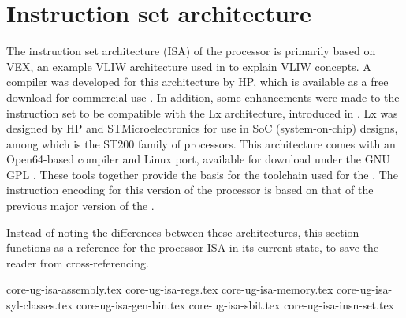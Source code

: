 
\clearpage
\section{Instruction set architecture}
\label{sec:core-ug-isa}

The instruction set architecture (ISA) of the \rvex{} processor is primarily 
based on VEX, an example VLIW architecture used in \cite{fisher2005} to explain 
VLIW concepts. A compiler was developed for this architecture by HP, which is 
available as a free download for commercial use \cite{hpvex}. In addition, some 
enhancements were made to the instruction set to be compatible with the Lx 
architecture, introduced in \cite{faraboschi2000}. Lx was designed by HP and 
STMicroelectronics for use in SoC (system-on-chip) designs, among which is the 
ST200 family of processors. This architecture comes with an Open64-based 
compiler and Linux port, available for download under the GNU GPL \cite{st200}. 
These tools together provide the basis for the toolchain used for the \rvex{}. 
The instruction encoding for this version of the \rvex{} processor is based on 
that of the previous major version of the \rvex{} \cite{seedorf2010}.

Instead of noting the differences between these architectures, this section 
functions as a reference for the \rvex{} processor ISA in its current state, to 
save the reader from cross-referencing.

{core-ug-isa-assembly.tex}
{core-ug-isa-regs.tex}
{core-ug-isa-memory.tex}
{core-ug-isa-syl-classes.tex}
{core-ug-isa-gen-bin.tex}
{core-ug-isa-sbit.tex}
{core-ug-isa-insn-set.tex}





